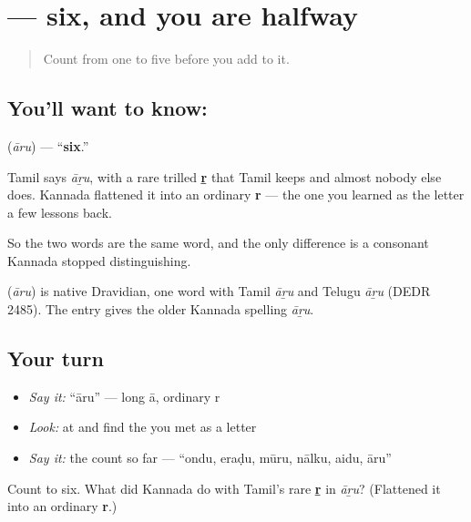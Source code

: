 \section[\texorpdfstring{\kn{ಆರು} (āru)}{ಆರು (āru)}]{ — six, and you are halfway}

\label{lesson:KA-C07-aaru}



\begin{quote}
Count from one to five before you add to it.
\end{quote}

\subsection*{You'll want to know: }
\textbf{} (\emph{āru}) — \textquotedblleft{}\textbf{six}.\textquotedblright{}

Tamil says \emph{āṟu}, with a rare trilled \textbf{ṟ} that Tamil keeps and almost nobody else does. Kannada flattened it into an ordinary \textbf{r} — the one you learned as the letter \textbf{} a few lessons back.

So the two words are the same word, and the only difference is a consonant Kannada stopped distinguishing.

\begin{cousinweb}
\textbf{} (\emph{āru}) is native Dravidian, one word with Tamil \emph{āṟu} and Telugu \emph{āṟu} (DEDR 2485). The entry gives the older Kannada spelling \emph{āṟu}.
\end{cousinweb}

\subsection*{Your turn}
\begin{itemize}
\raggedright
  \item \emph{Say it:} \textquotedblleft{}āru\textquotedblright{} — long ā, ordinary r
  \item \emph{Look:} at  and find the  you met as a letter
  \item \emph{Say it:} the count so far — \textquotedblleft{}ondu, eraḍu, mūru, nālku, aidu, āru\textquotedblright{}
\end{itemize}

\begin{tcolorbox}[breakable,colback=teal!4,colframe=teal!35!black,title={Before you move on}]
Count to six. What did Kannada do with Tamil's rare \textbf{ṟ} in \emph{āṟu}? (Flattened it into an ordinary \textbf{r}.)
\end{tcolorbox}
